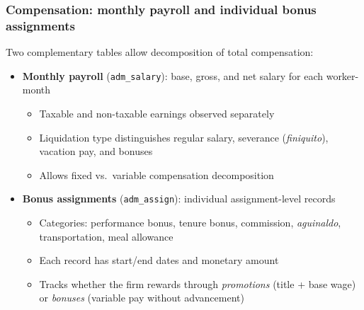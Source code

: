 \documentclass[aspectratio=169, 11pt]{beamer}
\begin{document}
\begin{frame}
\frametitle{Compensation: monthly payroll and individual bonus assignments}

Two complementary tables allow decomposition of total compensation:

\vspace{0.3cm}
\begin{itemize}
    \item \textbf{Monthly payroll} (\texttt{adm\_salary}): base, gross, and net salary for each worker-month
    \begin{itemize}
        \item Taxable and non-taxable earnings observed separately
        \item Liquidation type distinguishes regular salary, severance (\textit{finiquito}), vacation pay, and bonuses
        \item Allows fixed vs.\ variable compensation decomposition
    \end{itemize}

    \medskip
    \item \textbf{Bonus assignments} (\texttt{adm\_assign}): individual assignment-level records
    \begin{itemize}
        \item Categories: performance bonus, tenure bonus, commission, \textit{aguinaldo}, transportation, meal allowance
        \item Each record has start/end dates and monetary amount
        \item Tracks whether the firm rewards through \emph{promotions} (title + base wage) or \emph{bonuses} (variable pay without advancement)
    \end{itemize}
\end{itemize}

\end{frame}
\end{document}
